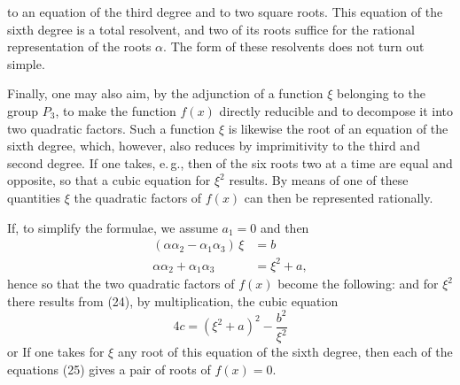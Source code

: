 
to an equation of the third degree and to two square roots. This
equation of the sixth degree is a total resolvent, and two of its
roots suffice for the rational representation of the roots $\alpha$. The
form of these resolvents does not turn out simple.

Finally, one may also aim, by the adjunction of a function $\xi$
belonging to the group $P_3$, to make the function $f(x)$ directly
reducible and to decompose it into two quadratic factors. Such a
function $\xi$ is likewise the root of an equation of the sixth degree,
which, however, also reduces by imprimitivity to the third and
second degree. If one takes, e.\,g.,
then of the six roots two at a time are equal and opposite, so
that a cubic equation for $\xi^2$ results. By means of one of these
quantities $\xi$ the quadratic factors of $f(x)$ can then be represented
rationally.

If, to simplify the formulae, we assume $a_1 = 0$ and
then
\[
\begin{aligned}
(\alpha\alpha_2 - \alpha_1\alpha_3)\,\xi &= b \\
\alpha\alpha_2 + \alpha_1\alpha_3 &= \xi^2 + a,
\end{aligned}
\]
hence
so that the two quadratic factors of $f(x)$ become the following:
and for $\xi^2$ there results from (24), by multiplication, the cubic
equation
\[
4c = (\xi^2 + a)^2 - \frac{b^2}{\xi^2}
\]
or
If one takes for $\xi$ any root of this equation of the sixth
degree, then each of the equations (25) gives a pair of roots
of $f(x) = 0$.
